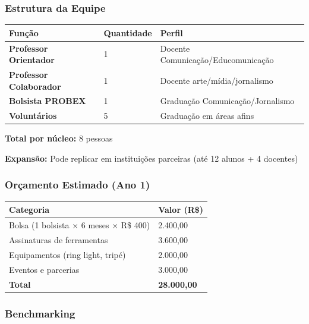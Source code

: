 \bigskip

\subsubsection{Estrutura da Equipe}

\bigskip\noindent
\begin{tabular}{p{}p{}p{}}
\toprule
Função & Quantidade & Perfil \\
\hline
\textbf{Professor Orientador} & 1 & Docente Comunicação/Educomunicação \\
\textbf{Professor Colaborador} & 1 & Docente arte/mídia/jornalismo \\
\textbf{Bolsista PROBEX} & 1 & Graduação Comunicação/Jornalismo \\
\textbf{Voluntários} & 5 & Graduação em áreas afins \\
\bottomrule
\end{tabular}

\bigskip

\textbf{Total por núcleo:} 8 pessoas

\textbf{Expansão:} Pode replicar em instituições parceiras (até 12 alunos + 4 docentes)

\subsubsection{Orçamento Estimado (Ano 1)}

\bigskip\noindent
\begin{tabular}{p{}p{}}
\toprule
Categoria & Valor (R\$) \\
\hline
Bolsa (1 bolsista $\times$ 6 meses $\times$ R\$ 400) & 2.400,00 \\
Assinaturas de ferramentas & 3.600,00 \\
Equipamentos (ring light, tripé) & 2.000,00 \\
Eventos e parcerias & 3.000,00 \\
\textbf{Total} & \textbf{28.000,00} \\
\bottomrule
\end{tabular}

\bigskip

\subsubsection{Benchmarking}

